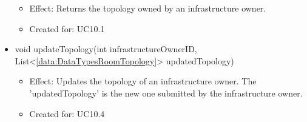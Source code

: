 \begin{description}
\begin{itemize}[noitemsep,nolistsep,leftmargin=-.25cm]
        \begin{itemize}[noitemsep,nolistsep]
           \item Effect: Returns the topology owned by an infrastructure owner.
\item Created for: UC10.1
        \end{itemize}
      \item \textsf{void updateTopology(int infrastructureOwnerID, List\textless{}\ref{data:DataTypesRoomTopology}\textgreater{} updatedTopology)}
        \begin{itemize}[noitemsep,nolistsep]
           \item Effect: Updates the topology of an infrastructure owner. The 'updatedTopology' is the new one submitted by the infrastructure owner.
\item Created for: UC10.4
        \end{itemize}
    \end{itemize}
    \end{description}

